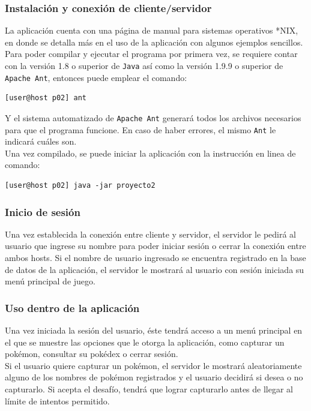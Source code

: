 \documentclass[12pt]{article}
\begin{document}
\subsubsection{Instalación y conexión de cliente/servidor}
La aplicación cuenta con una página de manual para sistemas operativos *NIX, en donde se detalla más en el uso de la aplicación con algunos ejemplos sencillos. \\
Para poder compilar y ejecutar el programa por primera vez, se requiere contar con la versión 1.8 o superior de \texttt{Java} así como la versión 1.9.9 o superior de \texttt{Apache Ant}, entonces puede emplear el comando: \\
\begin{verbatim}
[user@host p02] ant 
\end{verbatim}
Y el sistema automatizado de \texttt{Apache Ant} generará todos los archivos necesarios para que el programa funcione. En caso de haber errores, el mismo \texttt{Ant} le indicará cuáles son. \\

Una vez compilado, se puede iniciar la aplicación con la instrucción en linea de comando:
\begin{verbatim}
[user@host p02] java -jar proyecto2 
\end{verbatim}

\subsubsection{Inicio de sesión}
Una vez establecida la conexión entre cliente y servidor, el servidor le pedirá al usuario que ingrese su nombre para poder iniciar sesión o cerrar la conexión entre ambos hosts. Si el nombre de usuario ingresado se encuentra registrado en la base de datos de la aplicación, el servidor le mostrará al usuario con sesión iniciada su menú principal de juego.

\subsubsection{Uso dentro de la aplicación}
Una vez iniciada la sesión del usuario, éste tendrá acceso a un menú principal en el que se muestre las opciones que le otorga la aplicación, como capturar un pokémon, consultar su pokédex o cerrar sesión. \\

Si el usuario quiere capturar un pokémon, el servidor le mostrará aleatoriamente alguno de los nombres de pokémon registrados y el usuario decidirá si desea o no capturarlo. Si acepta el desafío, tendrá que lograr capturarlo antes de llegar al límite de intentos permitido. \\
\end{document}

